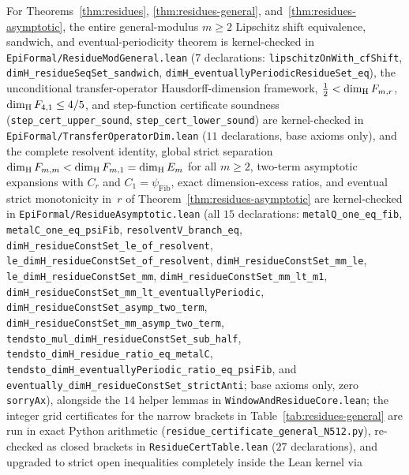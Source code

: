 For Theorems~\ref{thm:residues}, \ref{thm:residues-general}, and~\ref{thm:residues-asymptotic}, the entire general-modulus $m\ge2$ Lipschitz shift equivalence, sandwich, and eventual-periodicity theorem is kernel-checked in \texttt{EpiFormal/\allowbreak Residue\allowbreak ModGeneral.lean} ($7$ declarations: \texttt{lipschitz\allowbreak OnWith\_\allowbreak cfShift}, \texttt{dimH\_\allowbreak residueSeqSet\_\allowbreak sandwich}, \texttt{dimH\_\allowbreak eventually\allowbreak PeriodicResidueSet\_\allowbreak eq}), the unconditional transfer-operator Hausdorff-dimension framework, $\frac12<\dim_{\mathrm{H}} F_{m,r}$, $\dim_{\mathrm{H}} F_{4,1}\le 4/5$, and step-function certificate soundness (\texttt{step\_\allowbreak cert\_\allowbreak upper\_\allowbreak sound}, \texttt{step\_\allowbreak cert\_\allowbreak lower\_\allowbreak sound}) are kernel-checked in \texttt{EpiFormal/\allowbreak Transfer\allowbreak Operator\allowbreak Dim.lean} ($11$ declarations, base axioms only), and the complete resolvent identity, global strict separation $\dim_{\mathrm{H}} F_{m,m}<\dim_{\mathrm{H}} F_{m,1}=\dim_{\mathrm{H}} E_m$ for all $m\ge2$, two-term asymptotic expansions with $C_r$ and $C_1=\psi_{\mathrm{Fib}}$, exact dimension-excess ratios, and eventual strict monotonicity in~$r$ of Theorem~\ref{thm:residues-asymptotic} are kernel-checked in \texttt{EpiFormal/\allowbreak Residue\allowbreak Asymptotic.lean} (all $15$ declarations: \texttt{metalQ\_\allowbreak one\_\allowbreak eq\_\allowbreak fib}, \texttt{metalC\_\allowbreak one\_\allowbreak eq\_\allowbreak psiFib}, \texttt{resolventV\_\allowbreak branch\_\allowbreak eq}, \texttt{dimH\_\allowbreak residueConstSet\_\allowbreak le\_\allowbreak of\_\allowbreak resolvent}, \texttt{le\_\allowbreak dimH\_\allowbreak residueConstSet\_\allowbreak of\_\allowbreak resolvent}, \texttt{dimH\_\allowbreak residueConstSet\_\allowbreak mm\_\allowbreak le}, \texttt{le\_\allowbreak dimH\_\allowbreak residueConstSet\_\allowbreak mm}, \texttt{dimH\_\allowbreak residueConstSet\_\allowbreak mm\_\allowbreak lt\_\allowbreak m1}, \texttt{dimH\_\allowbreak residueConstSet\_\allowbreak mm\_\allowbreak lt\_\allowbreak eventuallyPeriodic}, \texttt{dimH\_\allowbreak residueConstSet\_\allowbreak asymp\_\allowbreak two\_\allowbreak term}, \texttt{dimH\_\allowbreak residueConstSet\_\allowbreak mm\_\allowbreak asymp\_\allowbreak two\_\allowbreak term}, \texttt{tendsto\_\allowbreak mul\_\allowbreak dimH\_\allowbreak residueConstSet\_\allowbreak sub\_\allowbreak half}, \texttt{tendsto\_\allowbreak dimH\_\allowbreak residue\_\allowbreak ratio\_\allowbreak eq\_\allowbreak metalC}, \texttt{tendsto\_\allowbreak dimH\_\allowbreak eventuallyPeriodic\_\allowbreak ratio\_\allowbreak eq\_\allowbreak psiFib}, and \texttt{eventually\_\allowbreak dimH\_\allowbreak residueConstSet\_\allowbreak strictAnti}; base axioms only, zero \texttt{sorryAx}), alongside the $14$ helper lemmas in \texttt{Window\allowbreak And\allowbreak Residue\allowbreak Core.lean}; the integer grid certificates for the narrow brackets in Table~\ref{tab:residues-general} are run in exact Python arithmetic (\texttt{residue\_\allowbreak certificate\_\allowbreak general\_\allowbreak N512.py}), re-checked as closed brackets in \texttt{Residue\allowbreak Cert\allowbreak Table.lean} ($27$ declarations), and upgraded to strict open inequalities completely inside the Lean kernel via 